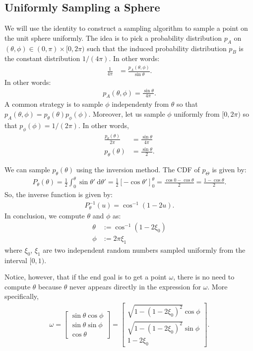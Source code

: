 \documentclass[10pt]{article}
\newcommand{\dee}{\mathrm{d}}
\begin{document}
  \subsection{Uniformly Sampling a Sphere}
  We will use the identity to construct a sampling algorithm to sample a point on the unit sphere uniformly.  The idea is to pick a probability distribution $p_A$ on $(\theta, \phi) \in (0, \pi) \times [0, 2\pi)$ such that the induced probability distribution $p_B$ is the constant distribution $1/(4\pi)$.  In other words:
  \begin{align*}
    \frac{1}{4\pi} &= \frac{p_A(\theta, \phi)}{\sin\theta}.
  \end{align*}
  In other words:
  \begin{align*}
    p_A (\theta, \phi) = \frac{\sin\theta}{4\pi}.
  \end{align*}  
  A common strategy is to sample $\phi$ independenty from $\theta$ so that $p_A(\theta, \phi) = p_\theta(\theta) p_\phi(\phi)$.  Moreover, let us sample $\phi$ uniformly from $[0,2\pi)$ so that $p_\phi(\phi) = 1/(2\pi)$.  In other words,
  \begin{align*}
    \frac{p_\theta(\theta)}{2\pi} &= \frac{\sin\theta}{4\pi} \\
    p_\theta(\theta) &= \frac{\sin\theta}{2}.
  \end{align*}

  We can sample $p_\theta(\theta)$ using the inversion method.  The CDF of $p_\Theta$ is given by:
  \begin{align*}
    P_\theta(\theta) 
    = \frac{1}{2} \int_{0}^\theta \sin\theta'\ \dee\theta'
    = \frac{1}{2} [-\cos\theta']_0^\theta
    = \frac{\cos 0 - \cos\theta}{2}
    = \frac{1 - \cos\theta}{2}.
  \end{align*}
  So, the inverse function is given by:
  \begin{align*}
    P^{-1}_\theta(u) = \cos^{-1}(1 - 2u).
  \end{align*}
  In conclusion, we compute $\theta$ and $\phi$ as:
  \begin{align*}
    \theta &:= \cos^{-1}(1 - 2\xi_0) \\
    \phi &:= 2\pi \xi_1
  \end{align*}
  where $\xi_0$, $\xi_1$ are two independent random numbers sampled uniformly from the interval $[0,1)$.

  Notice, however, that if the end goal is to get a point $\omega$, there is no need to compute $\theta$ because $\theta$ never appears directly in the expression for $\omega$.  More specifically,
  \begin{align*}
    \omega = \begin{bmatrix}
      \sin\theta \cos\phi \\
      \sin\theta \sin\phi \\
      \cos\theta
    \end{bmatrix}
    = \begin{bmatrix}
      \sqrt{1 - (1 - 2\xi_0)^2} \cos\phi \\
      \sqrt{1 - (1 - 2\xi_0)^2} \sin\phi \\
      1 - 2\xi_0
    \end{bmatrix}.
  \end{align*}
\end{document}
